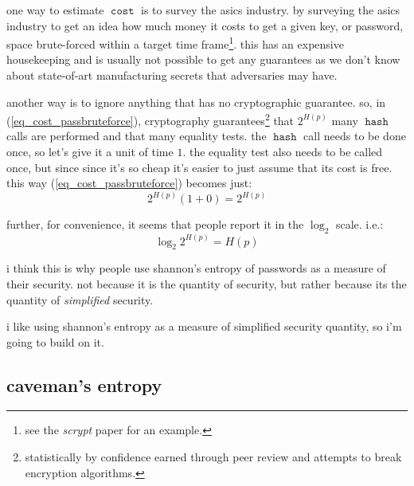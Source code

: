 \documentclass[twocolumn]{article}
\DeclareMathOperator{\hash}{\mathtt{hash}}
\DeclareMathOperator{\cost}{\mathtt{cost}}
\begin{document}
one way to estimate $\cost$ is to survey the asics industry.  by surveying
the asics industry to get an idea how much money it costs to get a given
key, or password, space brute-forced within a target time
frame\footnote{see the \emph{scrypt} paper for an example.}.  this has an
expensive housekeeping and is usually not possible to get any guarantees as
we don't know about state-of-art manufacturing secrets that adversaries may
have.

another way is to ignore anything that has no cryptographic guarantee.  so,
in (\ref{eq_cost_passbruteforce}), cryptography
guarantees\footnote{statistically by confidence earned through peer review
and attempts to break encryption algorithms.} that $2^{H(p)}$ many $\hash$
calls are performed and that many equality tests.  the $\hash$ call needs
to be done once, so let's give it a unit of time $1$.  the equality test
also needs to be called once, but since since it's so cheap it's easier to
just assume that its cost is free.  this way (\ref{eq_cost_passbruteforce})
becomes just:
\begin{equation}\label{eq_simplecost_passbruteforce}
    2^{H(p)} (1+0) = 2^{H(p)}
\end{equation}

further, for convenience, it seems that people report it in the $\log_2$
scale.  i.e.:
\begin{equation}\label{eq_pass_entropy}
    \log_2 2^{H(p)} = H(p)
\end{equation}

i think this is why people use shannon's entropy of passwords as a measure
of their security.  not because it is the quantity of security, but rather
because its the quantity of \emph{simplified} security.

i like using shannon's entropy as a measure of simplified security
quantity, so i'm going to build on it.

\subsection{caveman's entropy}
\end{document}
